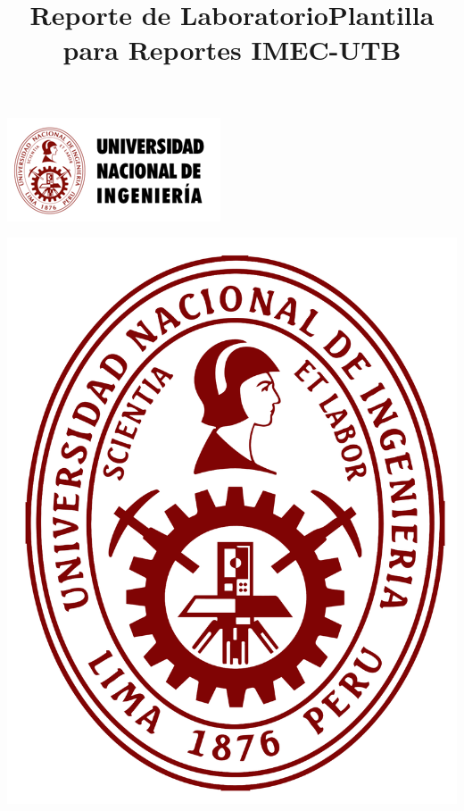 \documentclass[10pt]{article}
\title{Reporte de Laboratorio}
\title{Plantilla para Reportes IMEC-UTB}
\begin{document}
\begin{center}																		%
	\newcommand{\HRule}{\rule{\linewidth}{0.5mm}}									%
	\begin{minipage}{0.48\textwidth} \begin{flushleft}
			\includegraphics[scale = 0.9]{Imagenes/UNI_2.png}
		\end{flushleft}\end{minipage}
	\begin{minipage}{0.48\textwidth} \begin{flushright}
			\includegraphics[scale = 0.075]{Imagenes/UNI.png}
		\end{flushright}\end{minipage}


\end{center}
\end{document}
